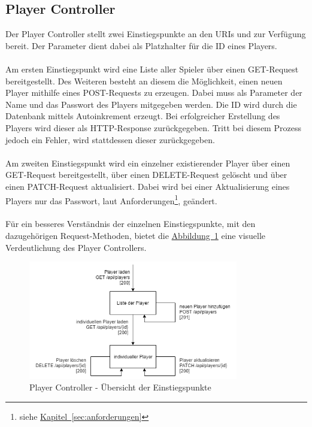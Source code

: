 \subsection{Player Controller}\label{sec:playerController}
Der Player Controller stellt zwei Einstiegspunkte an den \glspl{URI}  und  zur Verfügung bereit. Der Parameter  dient dabei als Platzhalter für die ID eines Players.\\
\\
Am ersten Einstiegspunkt wird eine Liste aller Spieler über einen GET-Request bereitgestellt. Des Weiteren besteht an diesem die Möglichkeit, einen neuen Player mithilfe eines POST-Requests zu erzeugen. Dabei muss als Parameter der Name und das Passwort des Players mitgegeben werden. Die ID wird durch die Datenbank mittels Autoinkrement erzeugt. Bei erfolgreicher Erstellung des Players wird dieser als \gls{HTTP}-Response zurückgegeben. Tritt bei diesem Prozess jedoch ein Fehler, wird stattdessen dieser zurückgegeben.\\
\\
Am zweiten Einstiegspunkt wird ein einzelner existierender Player über einen GET-Request bereitgestellt, über einen DELETE-Request gelöscht und über einen PATCH-Request aktualisiert. Dabei wird bei einer Aktualisierung eines Players nur das Passwort, laut Anforderungen\footnote{siehe \hyperref[sec:anforderungen]{Kapitel~\ref{sec:anforderungen}}}, geändert.\\
\\
Für ein besseres Verständnis der einzelnen Einstiegspunkte, mit den dazugehörigen Request-Methoden, bietet die \hyperref[fig:playerController]{Abbildung~\ref{fig:playerController}} eine visuelle Verdeutlichung des Player Controllers.\\
\begin{figure}[htb]
	\includegraphics[width=0.816\textwidth]{images/player-controller.png}
	\caption{Player Controller - Übersicht der Einstiegspunkte}
	\label{fig:playerController}
\end{figure}

